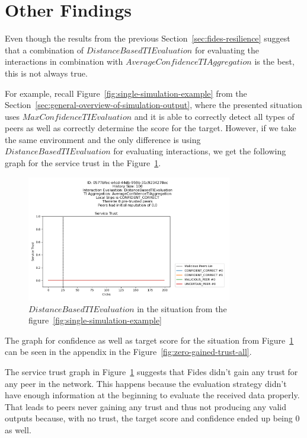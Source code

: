 \newpage
\section{Other Findings}
\label{sec:other-findings}

Even though the results from the previous Section~\ref{sec:fides-resilience} suggest that a combination of $DistanceBasedTIEvaluation$ for evaluating the interactions in combination with $AverageConfidenceTIAggregation$ is the best, this is not always true.

For example, recall Figure~\ref{fig:single-simulation-example} from the Section~\ref{sec:general-overview-of-simulation-output}, where the presented situation uses $MaxConfidenceTIEvaluation$ and it is able to correctly detect all types of peers as well as correctly determine the score for the target.
However, if we take the same environment and the only difference is using $DistanceBasedTIEvaluation$ for evaluating interactions, we get the following graph for the service trust in the Figure~\ref{fig:zero-gained-trust}.

\begin{figure}[h]
    \centering
    \includegraphics[width=0.8\textwidth]{assets/zero_gained_trust.png}
    \caption{$DistanceBasedTIEvaluation$ in the situation from the figure~\ref{fig:single-simulation-example}}
    \label{fig:zero-gained-trust}
\end{figure}

The graph for confidence as well as target score for the situation from Figure~\ref{fig:zero-gained-trust} can be seen in the appendix in the Figure~\ref{fig:zero-gained-trust-all}.

The service trust graph in Figure~\ref{fig:zero-gained-trust} suggests that Fides didn't gain any trust for any peer in the network.
This happens because the evaluation strategy didn't have enough information at the beginning to evaluate the received data properly.
That leads to peers never gaining any trust and thus not producing any valid outputs because, with no trust, the target score and confidence ended up being $0$ as well.